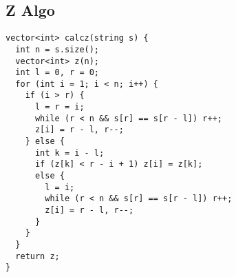 \documentclass[FSZ,a4paper,onesided]{article}
\begin{document}
\begin{multicols*}{\COLS}
\subsection{Z Algo}
\begin{lstlisting}
vector<int> calcz(string s) {
  int n = s.size();
  vector<int> z(n);
  int l = 0, r = 0;
  for (int i = 1; i < n; i++) {
    if (i > r) {
      l = r = i;
      while (r < n && s[r] == s[r - l]) r++;
      z[i] = r - l, r--;
    } else {
      int k = i - l;
      if (z[k] < r - i + 1) z[i] = z[k];
      else {
        l = i;
        while (r < n && s[r] == s[r - l]) r++;
        z[i] = r - l, r--;
      }
    }
  }
  return z;
}
\end{lstlisting}
\end{multicols*}

\end{document}
